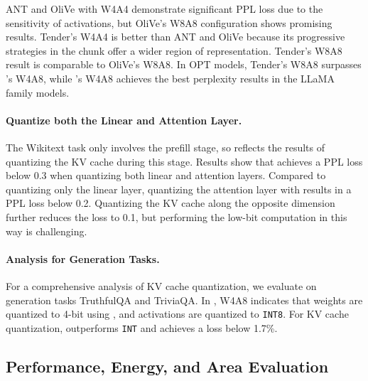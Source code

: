 ANT and OliVe with W4A4 demonstrate significant PPL loss due to the sensitivity of activations, but OliVe's W8A8 configuration shows promising results.
Tender's W4A4 is better than ANT and OliVe because its progressive strategies in the chunk offer a wider region of representation.
Tender's W8A8 result is comparable to OliVe's W8A8.
In OPT models, Tender's W8A8 surpasses \proj's W4A8, while \proj's W4A8 achieves the best perplexity results in the LLaMA family models.





\paragraph{Quantize both the Linear and Attention Layer. }
The Wikitext task only involves the prefill stage, so  reflects the results of quantizing the KV cache during this stage.
Results show that \proj achieves a PPL loss below 0.3 when quantizing both linear and attention layers.
Compared to quantizing only the linear layer, quantizing the attention layer with \proj results in a PPL loss below 0.2.
Quantizing the KV cache along the opposite dimension~\cite{liu2024kivi,hooper2024kvquant} further reduces the loss to 0.1, but performing the low-bit computation in this way is challenging.


\paragraph{Analysis for Generation Tasks.}
For a comprehensive analysis of KV cache quantization, we evaluate \proj on generation tasks TruthfulQA and TriviaQA.
In , W4A8 indicates that weights are quantized to 4-bit using \proj, and activations are quantized to \texttt{INT8}.
For KV cache quantization, \proj outperforms \texttt{INT} and achieves a loss below 1.7\%.






\subsection{Performance, Energy, and Area Evaluation}



